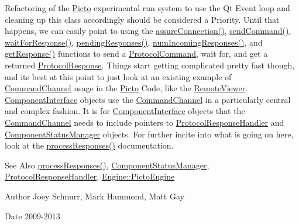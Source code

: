 Refactoring of the \hyperlink{namespace_picto}{Picto} experimental run system to use the Qt Event loop and cleaning up this class accordingly should be considered a Priority. Until that happens, we can easily point to using the \hyperlink{class_picto_1_1_command_channel_a785fa9b2dccc12b6419dc9d8be3d2e21}{assure\-Connection()}, \hyperlink{class_picto_1_1_command_channel_a5b6805cc3415f144d03ae7e343df3d32}{send\-Command()}, \hyperlink{class_picto_1_1_command_channel_adc000fefa9fa963e93aff6e067bca69c}{wait\-For\-Response()}, \hyperlink{class_picto_1_1_command_channel_a995ed26dfa4a7c97b2961279aec5f821}{pending\-Responses()}, \hyperlink{class_picto_1_1_command_channel_a1fa109c33aeb66291ba15979378fa0d5}{num\-Incoming\-Responses()}, and \hyperlink{class_picto_1_1_command_channel_af1735870ee016525f58b6c585fdad301}{get\-Response()} functions to send a \hyperlink{struct_picto_1_1_protocol_command}{Protocol\-Command}, wait for, and get a returned \hyperlink{struct_picto_1_1_protocol_response}{Protocol\-Response}. Things start getting complicated pretty fast though, and its best at this point to just look at an existing example of \hyperlink{class_picto_1_1_command_channel}{Command\-Channel} usage in the \hyperlink{namespace_picto}{Picto} Code, like the \hyperlink{class_remote_viewer}{Remote\-Viewer}. \hyperlink{class_component_interface}{Component\-Interface} objects use the \hyperlink{class_picto_1_1_command_channel}{Command\-Channel} in a particularly central and complex fashion. It is for \hyperlink{class_component_interface}{Component\-Interface} objects that the \hyperlink{class_picto_1_1_command_channel}{Command\-Channel} needs to include pointers to \hyperlink{struct_picto_1_1_protocol_response_handler}{Protocol\-Response\-Handler} and \hyperlink{class_component_status_manager}{Component\-Status\-Manager} objects. For further incite into what is going on here, look at the \hyperlink{class_picto_1_1_command_channel_aafe619791fb542563544ecf50628238b}{process\-Responses()} documentation. \begin{DoxySeeAlso}{See Also}
\hyperlink{class_picto_1_1_command_channel_aafe619791fb542563544ecf50628238b}{process\-Responses()}, \hyperlink{class_component_status_manager}{Component\-Status\-Manager}, \hyperlink{struct_picto_1_1_protocol_response_handler}{Protocol\-Response\-Handler}, \hyperlink{class_picto_1_1_engine_1_1_picto_engine}{Engine\-::\-Picto\-Engine} 
\end{DoxySeeAlso}
\begin{DoxyAuthor}{Author}
Joey Schnurr, Mark Hammond, Matt Gay 
\end{DoxyAuthor}
\begin{DoxyDate}{Date}
2009-\/2013 
\end{DoxyDate}


